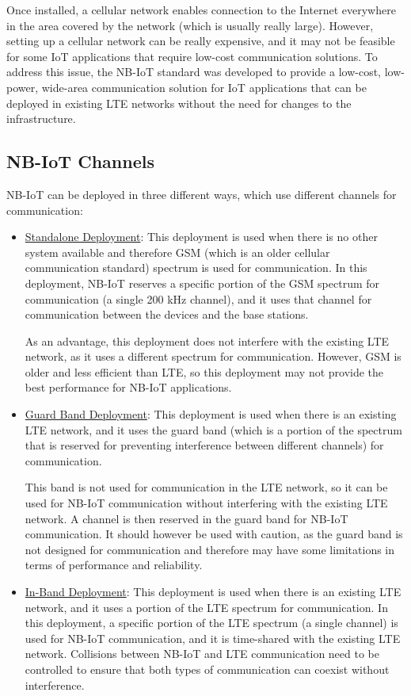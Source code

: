 Once installed, a cellular network enables connection to the Internet everywhere in the area covered by the network (which is usually really large). However, setting up a cellular network can be really expensive, and it may not be feasible for some IoT applications that require low-cost communication solutions. To address this issue, the NB-IoT standard was developed to provide a low-cost, low-power, wide-area communication solution for IoT applications that can be deployed in existing LTE networks without the need for changes to the infrastructure.


\subsection{NB-IoT Channels}

NB-IoT can be deployed in three different ways, which use different channels for communication:
\begin{itemize}
    \item \ul{Standalone Deployment}: This deployment is used when there is no other system available and therefore GSM (which is an older cellular communication standard) spectrum is used for communication. In this deployment, NB-IoT reserves a specific portion of the GSM spectrum for communication (a single 200 kHz channel), and it uses that channel for communication between the devices and the base stations.
    
    As an advantage, this deployment does not interfere with the existing LTE network, as it uses a different spectrum for communication. However, GSM is older and less efficient than LTE, so this deployment may not provide the best performance for NB-IoT applications.

    \item \ul{Guard Band Deployment}: This deployment is used when there is an existing LTE network, and it uses the guard band (which is a portion of the spectrum that is reserved for preventing interference between different channels) for communication.
    
    This band is not used for communication in the LTE network, so it can be used for NB-IoT communication without interfering with the existing LTE network. A channel is then reserved in the guard band for NB-IoT communication. It should however be used with caution, as the guard band is not designed for communication and therefore may have some limitations in terms of performance and reliability.
    
    \item \ul{In-Band Deployment}: This deployment is used when there is an existing LTE network, and it uses a portion of the LTE spectrum for communication. In this deployment, a specific portion of the LTE spectrum (a single channel) is used for NB-IoT communication, and it is time-shared with the existing LTE network. Collisions between NB-IoT and LTE communication need to be controlled to ensure that both types of communication can coexist without interference.
\end{itemize}


